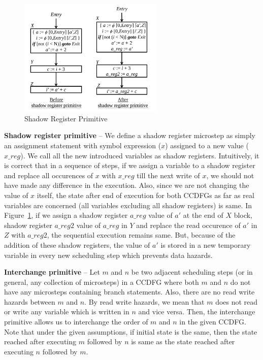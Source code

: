 \begin{figure}[t!]
\begin{center}
\includegraphics[height=2.2in]{fig-proposal/shadow-reg-primitive}
\end{center}
\caption{Shadow Register Primitive}
\label{fig:primitives1}
\end{figure}

{\textbf {Shadow register primitive}} -- We define a shadow register microstep as simply an assignment
statement with symbol expression ($x$) assigned to a new value ($x\_reg$). We call all the new introduced variables as shadow registers. Intuitively, it is correct that in a
sequence of steps, if we assign a variable to a shadow register and replace all occurences of $x$ with $x\_reg$
till the next write of $x$, we should
not have made any difference in the execution. Also, since we are not changing the value of $x$ itself,
 the state after end of execution for both CCDFGs as far as real variables are concerned (all variables
 excluding all shadow registers) is same. In Figure~\ref{fig:primitives1}, if we assign a shadow register
 $a\_reg$ value of $a'$ at the end of $X$ block, shadow register $a\_reg2$ value of $a\_reg$ in $Y$ and replace the read occurence of $a'$ in $Z$ with $a\_reg2$, the sequential execution remains same.
But, because of the addition of these shadow registers, the value of $a'$ is stored in a new temporary variable in every new scheduling step which prevents data hazards.

{\textbf {Interchange primitive}} -- Let $m$ and $n$ be two adjacent scheduling steps (or in general, any collection of microsteps) in a CCDFG where both $m$ and $n$ do not have any microsteps containing branch statements. Also, there are no read write hazards between $m$ and $n$. By read write hazards, we mean that $m$ does not read or write any variable which is written in $n$ and vice versa. Then, the interchange primitive allows us to interchange the order of $m$ and $n$ in the given CCDFG. Note that under the given assumptions, if initial state is the same, then the state reached after executing $m$ followed by $n$ is same as the state reached after executing $n$ followed by $m$.

